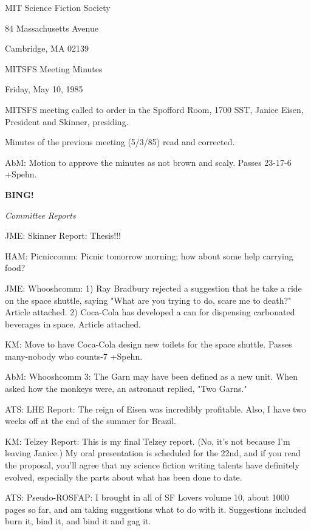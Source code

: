 \documentclass[12pt]{article}
\newcommand{\bing}{{\bf BING!} }
\newcommand{\goto}[1]{\bing \vskip 12pt \centerline{{\em{#1}}}}
\begin{document}
\begin{center}

MIT Science Fiction Society 

84 Massachusetts Avenue

Cambridge, MA 02139

\vspace{12pt}

MITSFS Meeting Minutes 

Friday, May 10, 1985

\end{center}
 
\vspace{18pt}

\setlength{\parskip}{6pt}

\noindent
MITSFS meeting called to order in the Spofford Room, 1700 SST,
Janice Eisen, President and Skinner, presiding.

Minutes of the previous meeting (5/3/85) read and corrected.

AbM: Motion to approve the minutes as not brown and scaly. Passes 23-17-6 +Spehn.

\goto{Committee Reports}

JME: Skinner Report: Thesis!!!

HAM: Picniccomm: Picnic tomorrow morning; how about some help carrying food?

JME: Whooshcomm: 1) Ray Bradbury rejected a suggestion that he take a ride on the space shuttle, saying "What are you trying to do, scare me to death?" Article attached. 2) Coca-Cola has developed a can for dispensing carbonated beverages in space. Article attached.

KM: Move to have Coca-Cola design new toilets for the space shuttle. Passes many-nobody who counts-7 +Spehn.

AbM: Whooshcomm 3: The Garn may have been defined as a new unit. When asked how the monkeys were, an astronaut replied, "Two Garns."

ATS: LHE Report: The reign of Eisen was incredibly profitable. Also, I have two weeks off at the end of the summer for Brazil.

KM: Telzey Report: This is my final Telzey report. (No, it's not because I'm leaving Janice.) My oral presentation is scheduled for the 22nd, and if you read the proposal, you'll agree that my science fiction writing talents have definitely evolved, especially the parts about what has been done to date.

ATS: Pseudo-ROSFAP: I brought in all of SF Lovers volume 10, about 1000 pages so far, and am taking suggestions what to do with it. Suggestions included burn it, bind it, and bind it and gag it.
\end{document}
